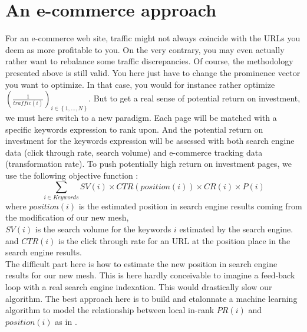 \documentclass{iSWAGArticle}
\begin{document}
  \section{An e-commerce approach}
  For an e-commerce web site, traffic might not always coincide with the URLs you deem as more profitable to you.
  On the very contrary, you may even actually rather want to rebalance some traffic discrepancies.
  Of course, the methodology presented above is still valid. You here just have to change the prominence vector you want to
  optimize. In that case, you would for instance rather optimize $\left(\frac{1}{traffic\left(i\right)}\right)_{i \in \left\{1,...,N\right\}}$.
  But to get a real sense of potential return on investment, we must here switch to a new paradigm.
  Each page will be matched with a specific keywords expression to rank upon. And the potential return on investment for the keywords expression will
  be assessed with both search engine data (click through rate, search volume) and e-commerce tracking data (transformation rate).
  To push potentially high return on investment pages, we use the following objective function :
  \begin{equation}
  \sum_{i\in Keywords} SV\left( i\right)\times CTR\left(position\left(i\right)\right)\times CR\left(i\right)\times P\left(i\right)
  \end{equation}
  where $position\left(i\right)$ is the estimated position in search engine results coming from the modification of our new mesh,
  \\\newline
  $SV\left(i\right)$ is the search volume for the keywords $i$ estimated by the search engine.
  \\\newline
  and $CTR\left(i\right)$ is the click through rate for an URL at the position place in the search engine results.
  \\\newline
  The difficult part here is how to estimate the new position in search engine results for our new mesh.
  This is here hardly conceivable to imagine a feed-back loop with a real search engine indexation. This would drastically
  slow our algorithm. The best approach here is to build and etalonnate a machine learning algorithm to model the relationship between local in-rank $PR\left(i\right)$
  and $position(i)$ as in \cite{learning_to_rank}.
\end{document}
